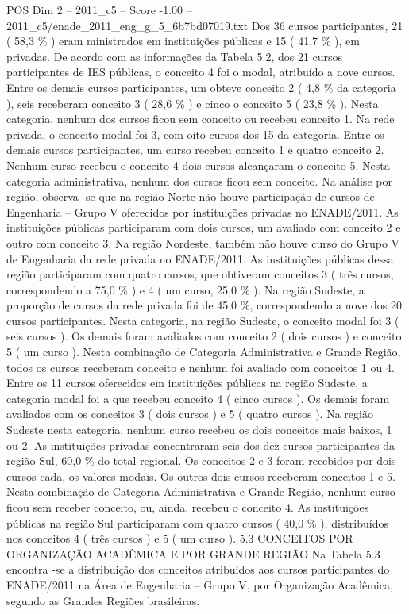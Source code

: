 \begin{textsample}{POS Dim 2 – 2011\_c5 – Score -1.00 – 2011\_c5/enade\_2011\_eng\_g\_5\_6b7bd07019.txt}
Dos 36 cursos participantes, 21 ( 58,3 \% ) eram ministrados em instituições públicas e 15 ( 41,7 \% ), em privadas.
De acordo com as informações da Tabela 5.2, dos 21 cursos participantes de IES públicas, o conceito 4 foi o modal, atribuído a nove cursos.
Entre os demais cursos participantes, um obteve conceito 2 ( 4,8 \% da categoria ), seis receberam conceito 3 ( 28,6 \% ) e cinco o conceito 5 ( 23,8 \% ).
Nesta categoria, nenhum dos cursos ficou sem conceito ou recebeu conceito 1.
Na rede privada, o conceito modal foi 3, com oito cursos dos 15 da categoria.
Entre os demais cursos participantes, um curso recebeu conceito 1 e quatro conceito 2.
Nenhum curso recebeu o conceito 4 dois cursos alcançaram o conceito 5.
Nesta categoria administrativa, nenhum dos cursos ficou sem conceito.
Na análise por região, observa -se que na região Norte não houve participação de cursos de Engenharia – Grupo V oferecidos por instituições privadas no ENADE/2011.
As instituições públicas participaram com dois cursos, um avaliado com conceito 2 e outro com conceito 3.
Na região Nordeste, também não houve curso do Grupo V de Engenharia da rede privada no ENADE/2011.
As instituições públicas dessa região participaram com quatro cursos, que obtiveram conceitos 3 ( três cursos, correspondendo a 75,0 \% ) e 4 ( um curso, 25,0 \% ).
Na região Sudeste, a proporção de cursos da rede privada foi de 45,0 \%, correspondendo a nove dos 20 cursos participantes.
Nesta categoria, na região Sudeste, o conceito modal foi 3 ( seis cursos ).
Os demais foram avaliados com conceito 2 ( dois cursos ) e conceito 5 ( um curso ).
Nesta combinação de Categoria Administrativa e Grande Região, todos os cursos receberam conceito e nenhum foi avaliado com conceitos 1 ou 4.
Entre os 11 cursos oferecidos em instituições públicas na região Sudeste, a categoria modal foi a que recebeu conceito 4 ( cinco cursos ).
Os demais foram avaliados com os conceitos 3 ( dois cursos ) e 5 ( quatro cursos ).
Na região Sudeste nesta categoria, nenhum curso recebeu os dois conceitos mais baixos, 1 ou 2.
As instituições privadas concentraram seis dos dez cursos participantes da região Sul, 60,0 \% do total regional.
Os conceitos 2 e 3 foram recebidos por dois cursos cada, os valores modais.
Os outros dois cursos receberam conceitos 1 e 5.
Nesta combinação de Categoria Administrativa e Grande Região, nenhum curso ficou sem receber conceito, ou, ainda, recebeu o conceito 4.
As instituições públicas na região Sul participaram com quatro cursos ( 40,0 \% ), distribuídos nos conceitos 4 ( três cursos ) e 5 ( um curso ). 5.3 CONCEITOS POR ORGANIZAÇÃO ACADÊMICA E POR GRANDE REGIÃO Na Tabela 5.3 encontra -se a distribuição dos conceitos atribuídos aos cursos participantes do ENADE/2011 na Área de Engenharia – Grupo V, por Organização Acadêmica, segundo as Grandes Regiões brasileiras.

\end{textsample}
